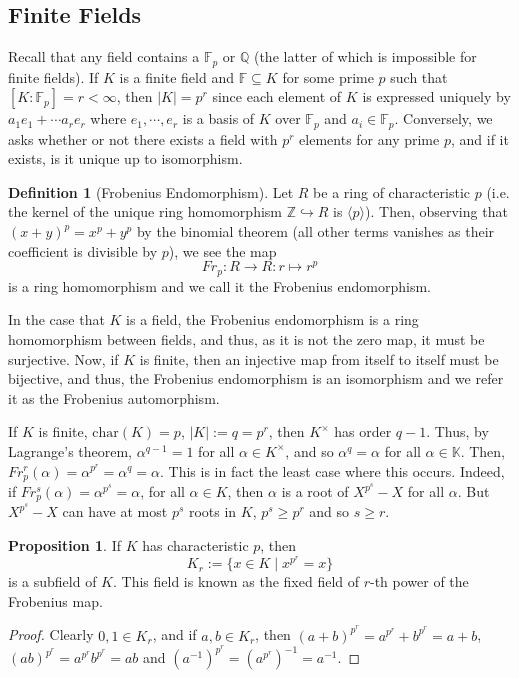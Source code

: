 \documentclass[]{article}
\theoremstyle{definition}
\theoremstyle{definition}
\newtheorem{definition}{Definition}[section]
\newtheorem{proposition}{Proposition}[section]
\begin{document}
\subsection{Finite Fields}

Recall that any field contains a \(\mathbb{F}_p\) or \(\mathbb{Q}\) 
(the latter of which is impossible for finite fields). If \(K\) is a finite 
field and \(\mathbb{F} \subseteq K\) for some prime \(p\) such that 
\([K : \mathbb{F}_p] = r < \infty\), then \(|K| = p^r\) since each element of 
\(K\) is expressed uniquely by \(a_1 e_1 + \cdots a_r e_r\) where 
\(e_1, \cdots, e_r\) is a basis of \(K\) over \(\mathbb{F}_p\) and 
\(a_i \in \mathbb{F}_p\). Conversely, we asks whether or not there exists a 
field with \(p^r\) elements for any prime \(p\), and if it exists, is it 
unique up to isomorphism.

\begin{definition}[Frobenius Endomorphism]
  Let \(R\) be a ring of characteristic \(p\) (i.e. the kernel of the unique 
  ring homomorphism \(\mathbb{Z} \hookrightarrow R\) is \(\langle p \rangle\)). 
  Then, observing that \((x + y)^p = x^p + y^p\) by the binomial theorem 
  (all other terms vanishes as their coefficient is divisible by \(p\)), we 
  see the map 
  \[Fr_p : R \to R : r  \mapsto r^p\] 
  is a ring homomorphism and we call it the Frobenius endomorphism.
\end{definition}

In the case that \(K\) is a field, the Frobenius endomorphism is a 
ring homomorphism between fields, and thus, as it is not the zero map, it 
must be surjective. Now, if \(K\) is finite, then an injective map from 
itself to itself must be bijective, and thus, the Frobenius endomorphism is 
an isomorphism and we refer it as the Frobenius automorphism.

If \(K\) is finite, \(\text{char}(K) = p\), \(|K| := q = p^r\), then 
\(K^\times\) has order \(q - 1\). Thus, by Lagrange's theorem, 
\(\alpha^{q - 1} = 1\) for all \(\alpha \in K^\times\), and so 
\(\alpha^q = \alpha\) for all \(\alpha \in \mathbb{K}\). Then, 
\(Fr_p^r(\alpha) = \alpha^{p^r} = \alpha^q = \alpha\). This is in fact the 
least case where this occurs. Indeed, if \(Fr_p^s(\alpha) = \alpha^{p^s} = \alpha\), 
for all \(\alpha \in K\), then \(\alpha\) is a root of \(X^{p^s} - X\) for all 
\(\alpha\). But \(X^{p^s} - X\) can have at most \(p^s\) roots in \(K\), 
\(p^s \ge p^r\) and so \(s \ge r\).

\begin{proposition}
  If \(K\) has characteristic \(p\), then 
  \[K_r := \{x \in K \mid x^{p^r} = x\}\]
  is a subfield of \(K\). This field is known as the fixed field of \(r\)-th 
  power of the Frobenius map.
\end{proposition}
\begin{proof}
  Clearly \(0, 1 \in K_r\), and if \(a, b \in K_r\), then 
  \((a + b)^{p^r} = a^{p^r} + b^{p^r} = a + b\), 
  \((ab)^{p^r} = a^{p^r}b^{p^r} = ab\) and 
  \((a^{-1})^{p^r} = (a^{p^r})^{-1} = a^{-1}\).
\end{proof}
\end{document}
